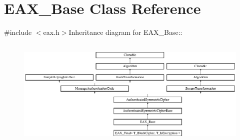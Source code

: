 \hypertarget{class_e_a_x___base}{
\section{EAX\_\-Base Class Reference}
\label{class_e_a_x___base}
}


 


{\ttfamily \#include $<$eax.h$>$}Inheritance diagram for EAX\_\-Base::\begin{figure}[H]
\begin{center}
\leavevmode
\includegraphics[height=5.31435cm]{class_e_a_x___base}
\end{center}
\end{figure}
